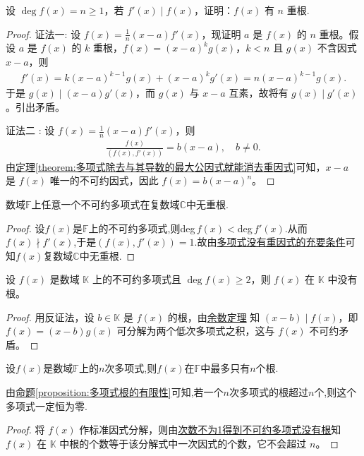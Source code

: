 \documentclass[lang=cn,newtx,10pt,scheme=chinese]{elegantbook}
\begin{document}
\begin{proposition}\label{proposition:f有n重根的判断条件}
设 $\deg f(x) = n \geq 1$，若 $f'(x) \mid f(x)$，证明：$f(x)$ 有 $n$ 重根.
\end{proposition}
\begin{proof}
{\color{blue}证法一:}
设 $f(x) = \frac{1}{n}(x - a)f'(x)$，现证明 $a$ 是 $f(x)$ 的 $n$ 重根。假设 $a$ 是 $f(x)$ 的 $k$ 重根，$f(x) = (x - a)^k g(x)$，$k < n$ 且 $g(x)$ 不含因式 $x - a$，则
\begin{align*}
f'(x) = k(x - a)^{k-1}g(x) + (x - a)^k g'(x) = n(x - a)^{k-1}g(x).
\end{align*}
于是 $g(x) \mid (x - a)g'(x)$，而 $g(x)$ 与 $x - a$ 互素，故将有 $g(x) \mid g'(x)$。引出矛盾。

{\color{blue}证法二 :} 设 $f(x) = \frac{1}{n}(x - a)f'(x)$，则
\begin{align*}
\frac{f(x)}{(f(x), f'(x))} = b(x - a), \quad b \neq 0.
\end{align*}
由\hyperref[theorem:多项式除去与其导数的最大公因式就能消去重因式]{定理\ref{theorem:多项式除去与其导数的最大公因式就能消去重因式}}可知，$x - a$ 是 $f(x)$ 唯一的不可约因式，因此 $f(x) = b(x - a)^n$。
\end{proof}

\begin{proposition}
数域$\mathbb{F}$上任意一个不可约多项式在复数域$\mathbb{C}$中无重根.
\end{proposition}
\begin{proof}
设$f(x)$是$\mathbb{F}$上的不可约多项式,则deg$\,f(x)<$deg$\,f'(x)$.从而$f(x)\nmid f'(x)$,于是$(f(x),f'(x))=1$.故由\hyperref[theorem:多项式没有重因式的充要条件]{多项式没有重因式的充要条件}可知$f(x)$复数域$\mathbb{C}$中无重根.
\end{proof}

\begin{lemma}\label{lemma:次数不为1得到不可约多项式没有根}
设 $f(x)$ 是数域 $\mathbb{K}$ 上的不可约多项式且 $\deg f(x) \geq 2$，则 $f(x)$ 在 $\mathbb{K}$ 中没有根。
\end{lemma}
\begin{proof}
用反证法，设 $b \in \mathbb{K}$ 是 $f(x)$ 的根，由\hyperref[theorem:余数定理]{余数定理} 知 $(x - b) \mid f(x)$，即 $f(x) = (x - b)g(x)$ 可分解为两个低次多项式之积，这与 $f(x)$ 不可约矛盾。
\end{proof}

\begin{theorem}[多项式根的有限性]\label{theorem:多项式根的有限性}
设\(f(x)\)是数域\(\mathbb{F}\)上的\(n\)次多项式,则\(f(x)\)在\(\mathbb{F}\)中最多只有\(n\)个根.
\end{theorem}
\begin{note}
由\hyperref[proposition:多项式根的有限性]{命题\ref{proposition:多项式根的有限性}}可知,若一个$n$次多项式的根超过$n$个,则这个多项式一定恒为零.
\end{note}
\begin{proof}
将 $f(x)$ 作标准因式分解，则由\hyperref[lemma:次数不为1得到不可约多项式没有根]{次数不为1得到不可约多项式没有根}知 $f(x)$ 在 $\mathbb{K}$ 中根的个数等于该分解式中一次因式的个数，它不会超过 $n$。
\end{proof}
\end{document}
